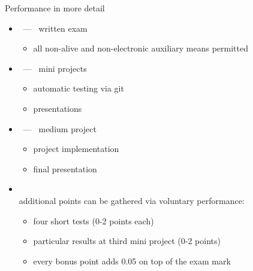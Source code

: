 \begin{frame}[c]{Performance in more detail}
  \begin{itemize}
  \item<1->  \ --- \ \alert{written exam}
    \begin{itemize}
    \item all non-alive and non-electronic auxiliary means permitted
    \end{itemize}
    \medskip
  \item<1->  \ --- \ \alert{mini projects}
    \begin{itemize}
    \item automatic testing via git
    \item presentations
    \end{itemize}
    \medskip
  \item<2->  \ --- \ \alert{medium project}
    \begin{itemize}
    \item project implementation
    \item final presentation
    \end{itemize}
    \medskip
  \item<3-> \\\small
    additional points can be gathered via voluntary performance:
    \begin{itemize}
    \item four short tests  (0-2 points each)
    \item particular results at third mini project (0-2 points)
    \item every bonus point adds 0.05 on top of the exam mark
    \end{itemize}
  \end{itemize}
\end{frame}
%
